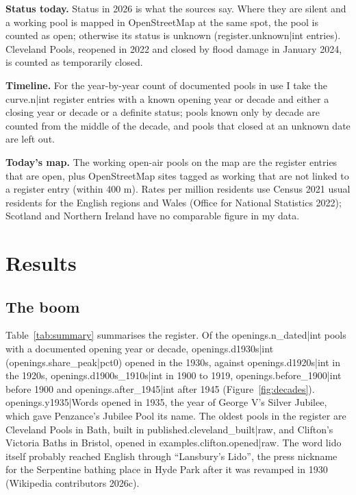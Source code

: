 \documentclass[11pt,a4paper]{article}
\begin{document}
\textbf{Status today.} Status in 2026 is what the sources say. Where they are silent and a working pool is mapped in OpenStreetMap at the same spot, the pool is counted as open; otherwise its status is unknown ({{register.unknown|int}} entries). Cleveland Pools, reopened in 2022 and closed by flood damage in January 2024, is counted as temporarily closed.

\textbf{Timeline.} For the year-by-year count of documented pools in use I take the {{curve.n|int}} register entries with a known opening year or decade and either a closing year or decade or a definite status; pools known only by decade are counted from the middle of the decade, and pools that closed at an unknown date are left out.

\textbf{Today's map.} The working open-air pools on the map are the register entries that are open, plus OpenStreetMap sites tagged as working that are not linked to a register entry (within 400 m). Rates per million residents use Census 2021 usual residents for the English regions and Wales (Office for National Statistics 2022); Scotland and Northern Ireland have no comparable figure in my data.

\section{Results}

\subsection{The boom}

Table~\ref{tab:summary} summarises the register. Of the {{openings.n_dated|int}} pools with a documented opening year or decade, {{openings.d1930s|int}} ({{openings.share_peak|pct0}}) opened in the 1930s, against {{openings.d1920s|int}} in the 1920s, {{openings.d1900s_1910s|int}} in 1900 to 1919, {{openings.before_1900|int}} before 1900 and {{openings.after_1945|int}} after 1945 (Figure~\ref{fig:decades}). {{openings.y1935|Words}} opened in 1935, the year of George V's Silver Jubilee, which gave Penzance's Jubilee Pool its name. The oldest pools in the register are Cleveland Pools in Bath, built in {{published.cleveland_built|raw}}, and Clifton's Victoria Baths in Bristol, opened in {{examples.clifton.opened|raw}}. The word lido itself probably reached English through ``Lansbury's Lido'', the press nickname for the Serpentine bathing place in Hyde Park after it was revamped in 1930 (Wikipedia contributors 2026c).
\end{document}
